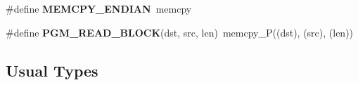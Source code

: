 \begin{DoxyCompactItemize}
\item 
\hypertarget{group__group__xmega__utils_ga85a7d71a016789b1766f9b27d0530347}{\#define {\bfseries M\-E\-M\-C\-P\-Y\-\_\-\-E\-N\-D\-I\-A\-N}~memcpy}\label{group__group__xmega__utils_ga85a7d71a016789b1766f9b27d0530347}

\item 
\hypertarget{group__group__xmega__utils_ga8900e4615b7d7143a6c38e2a39087538}{\#define {\bfseries P\-G\-M\-\_\-\-R\-E\-A\-D\-\_\-\-B\-L\-O\-C\-K}(dst, src, len)~memcpy\-\_\-\-P((dst), (src), (len))}\label{group__group__xmega__utils_ga8900e4615b7d7143a6c38e2a39087538}

\end{DoxyCompactItemize}
\subsection*{Usual Types}
